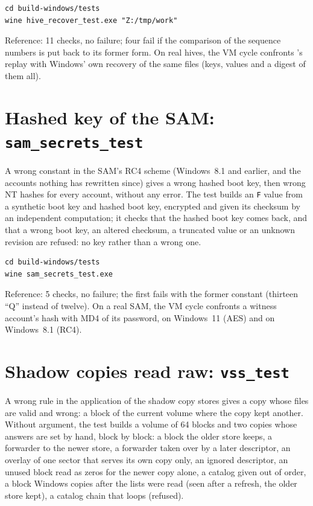 \documentclass[11pt,a4paper,oneside]{report}
\begin{document}
\begin{lstlisting}
cd build-windows/tests
wine hive_recover_test.exe "Z:/tmp/work"
\end{lstlisting}

Reference: 11 checks, no failure; four fail if the comparison of the sequence
numbers is put back to its former form. On real hives, the VM cycle confronts
\wac{}'s replay with Windows' own recovery of the same files (keys, values and
a digest of them all).

\section{Hashed key of the SAM: \texttt{sam\_secrets\_test}}

A wrong constant in the SAM's RC4 scheme (Windows~8.1 and earlier, and the
accounts nothing has rewritten since) gives a wrong hashed boot key, then
wrong NT hashes for every account, without any error. The test builds an
\texttt{F} value from a synthetic boot key and hashed boot key, encrypted and
given its checksum by an independent computation; it checks that the hashed
boot key comes back, and that a wrong boot key, an altered checksum, a
truncated value or an unknown revision are refused: no key rather than a
wrong one.

\begin{lstlisting}
cd build-windows/tests
wine sam_secrets_test.exe
\end{lstlisting}

Reference: 5 checks, no failure; the first fails with the former constant
(thirteen ``Q'' instead of twelve). On a real SAM, the VM cycle confronts a
witness account's hash with MD4 of its password, on Windows~11 (AES) and on
Windows~8.1 (RC4).

\section{Shadow copies read raw: \texttt{vss\_test}}

A wrong rule in the application of the shadow copy stores gives a copy whose
files are valid and wrong: a block of the current volume where the copy kept
another. Without argument, the test builds a volume of 64 blocks and two copies
whose answers are set by hand, block by block: a block the older store keeps, a
forwarder to the newer store, a forwarder taken over by a later descriptor, an
overlay of one sector that serves its own copy only, an ignored descriptor, an
unused block read as zeros for the newer copy alone, a catalog given out of
order, a block Windows copies after the lists were read (seen after a refresh,
the older store kept), a catalog chain that loops (refused).
\end{document}
